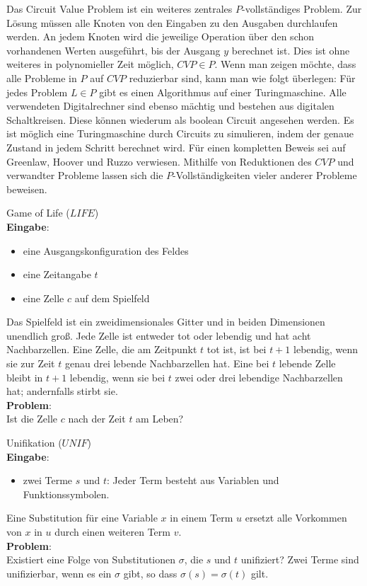 Das Circuit Value Problem ist ein weiteres zentrales $P$-vollständiges Problem.
Zur Lösung müssen alle Knoten von den Eingaben zu den Ausgaben durchlaufen
werden.
An jedem Knoten wird die jeweilige Operation über den schon vorhandenen Werten
ausgeführt, bis der Ausgang $y$ berechnet ist.
Dies ist ohne weiteres in polynomieller Zeit möglich, $CVP \in P$.
Wenn man zeigen möchte, dass alle Probleme in $P$ auf $CVP$ reduzierbar sind,
kann man wie folgt überlegen:
Für jedes Problem $L \in P$ gibt es einen Algorithmus auf einer Turingmaschine.
Alle verwendeten Digitalrechner sind ebenso mächtig und bestehen aus digitalen
Schaltkreisen.
Diese können wiederum als boolean Circuit angesehen werden.
Es ist möglich eine Turingmaschine durch Circuits zu simulieren, indem der
genaue Zustand in jedem Schritt berechnet wird. \cite[S.59f,71f]{greenlaw}
Für einen kompletten Beweis sei auf Greenlaw, Hoover und Ruzzo \cite[Kapitel 6]{greenlaw}
verwiesen.
Mithilfe von Reduktionen des $CVP$ und verwandter Probleme lassen sich die
$P$-Vollständigkeiten vieler anderer Probleme beweisen.

\begin{problem}
    Game of Life ($LIFE$) \\
    \textbf{Eingabe}:
    \begin{itemize}
        \item eine Ausgangskonfiguration des Feldes
        \item eine Zeitangabe $t$
        \item eine Zelle $c$ auf dem Spielfeld
    \end{itemize}
    Das Spielfeld ist ein zweidimensionales Gitter und in beiden Dimensionen
    unendlich groß.
    Jede Zelle ist entweder tot oder lebendig und hat acht Nachbarzellen.
    Eine Zelle, die am Zeitpunkt $t$ tot ist, ist bei $t+1$ lebendig,
    wenn sie zur Zeit $t$ genau drei lebende Nachbarzellen hat.
    Eine bei $t$ lebende Zelle bleibt in $t+1$ lebendig, wenn sie bei $t$ zwei
    oder drei lebendige Nachbarzellen hat; andernfalls stirbt sie. \\
    \textbf{Problem}: \\
    Ist die Zelle $c$ nach der Zeit $t$ am Leben?
    \cite[S.211]{greenlaw}
\end{problem}

\begin{problem}
    Unifikation ($UNIF$) \\
    \textbf{Eingabe}:
    \begin{itemize}
        \item zwei Terme $s$ und $t$: Jeder Term besteht aus Variablen und
            Funktionssymbolen.
    \end{itemize}
    Eine Substitution für eine Variable $x$ in einem Term $u$ ersetzt alle
    Vorkommen von $x$ in $u$ durch einen weiteren Term $v$. \\
    \textbf{Problem}: \\
    Existiert eine Folge von Substitutionen $\sigma$, die $s$ und $t$
    unifiziert?
    Zwei Terme sind unifizierbar, wenn es ein $\sigma$ gibt, so dass
    $\sigma(s) = \sigma(t)$ gilt.
    \cite[S.171]{greenlaw}
\end{problem}


